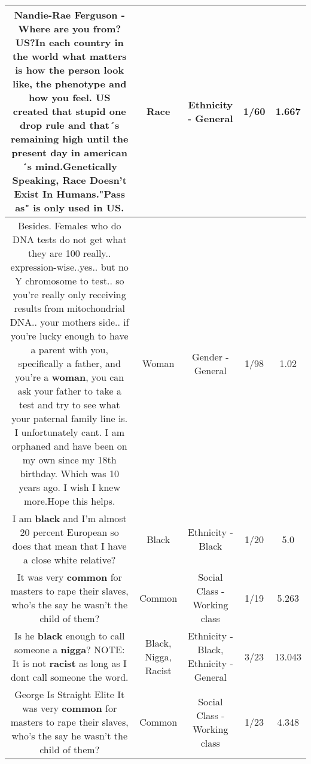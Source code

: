 \documentclass[11pt]{article}
\newlength\mylength
\begin{document}
\begin{center}
\begin{longtable}{|C{.65\mylength}|C{.30\mylength}|C{.12\mylength}|C{.12\mylength}|C{.12\mylength}|}
  \small Nandie-Rae Ferguson - Where are you from? US?In each country in the world what matters is how the person look like, the phenotype and how you feel. US created that stupid one drop rule and that´s remaining high until the present day in american´s mind.Genetically Speaking, \textbf{Race} Doesn't Exist In Humans."Pass as" is only used in US.\normalsize   & Race & Ethnicity - General & 1/60 & 1.667 \\  \hline
  \small Besides.  Females who do DNA tests do not get what they are 100 really.. expression-wise..yes.. but no Y chromosome to test.. so you're really only receiving results from mitochondrial DNA.. your mothers side.. if you're lucky enough to have a parent with you, specifically a father, and you're a \textbf{woman}, you can ask your father to take a test and try to see what your paternal family line is. I unfortunately cant. I am orphaned and have been on my own since my 18th birthday. Which was 10 years ago. I wish I knew more.Hope this helps.\normalsize   & Woman & Gender - General & 1/98 & 1.02 \\  \hline
  \small I am \textbf{black} and I'm almost 20 percent European so does that mean that I have a close white relative?\normalsize   & Black & Ethnicity - Black & 1/20 & 5.0 \\  \hline
  \small It was very \textbf{common} for masters to rape their slaves, who's the say he wasn't the child of them?\normalsize   & Common & Social Class - Working class & 1/19 & 5.263 \\  \hline
  \small Is he \textbf{black} enough to call someone a \textbf{nigga}? NOTE: It is not \textbf{racist} as long as I dont call someone the word.\normalsize   & Black, Nigga, Racist & Ethnicity - Black, Ethnicity - General & 3/23 & 13.043 \\  \hline
  \small George Is Straight Elite It was very \textbf{common} for masters to rape their slaves, who's the say he wasn't the child of them?\normalsize   & Common & Social Class - Working class & 1/23 & 4.348 \\  \hline

\end{longtable}
\end{center}
\end{document}

